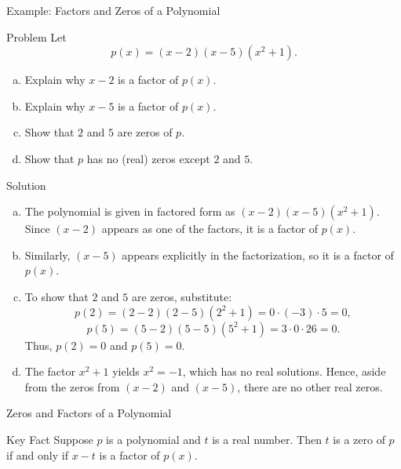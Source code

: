 \documentclass{beamer}
\begin{document}
\begin{frame}{Example: Factors and Zeros of a Polynomial}
  \begin{exampleblock}{Problem}
    Let 
    \[
      p(x) = (x-2)(x-5)(x^2+1).
    \]
    \begin{enumerate}[(a)]
      \item Explain why \(x-2\) is a factor of \(p(x)\).
      \item Explain why \(x-5\) is a factor of \(p(x)\).
      \item Show that \(2\) and \(5\) are zeros of \(p\).
      \item Show that \(p\) has no (real) zeros except \(2\) and \(5\).
    \end{enumerate}
  \end{exampleblock}
\end{frame}
\begin{frame}
  \begin{block}{Solution}
    \begin{enumerate}[(a)]
      \item The polynomial is given in factored form as \((x-2)(x-5)(x^2+1)\). Since \((x-2)\) appears as one of the factors, it is a factor of \(p(x)\).
      \item Similarly, \((x-5)\) appears explicitly in the factorization, so it is a factor of \(p(x)\).
      \item To show that \(2\) and \(5\) are zeros, substitute:
        \[
          p(2) = (2-2)(2-5)(2^2+1) = 0\cdot(-3)\cdot5 = 0,
        \]
        \[
          p(5) = (5-2)(5-5)(5^2+1) = 3\cdot0\cdot26 = 0.
        \]
        Thus, \(p(2)=0\) and \(p(5)=0\).
      \item The factor \(x^2+1\) yields \(x^2=-1\), which has no real solutions. Hence, aside from the zeros from \((x-2)\) and \((x-5)\), there are no other real zeros.
    \end{enumerate}
  \end{block}
\end{frame}

\begin{frame}{Zeros and Factors of a Polynomial}
  \begin{block}{Key Fact}
    Suppose \(p\) is a polynomial and \(t\) is a real number. Then \(t\) is a zero of \(p\) if and only if \(x-t\) is a factor of \(p(x)\).
  \end{block}
\end{frame}
\end{document}

